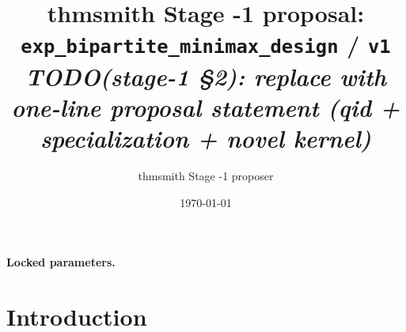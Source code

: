 \documentclass[11pt]{article}
\title{thmsmith Stage -1 proposal: \texttt{exp\_bipartite\_minimax\_design} / \texttt{v1}%
  \\ \large\textit{TODO(stage-1 \S2): replace with one-line proposal statement (qid + specialization + novel kernel)}}
\author{thmsmith Stage -1 proposer}
\date{\today}
\theoremstyle{definition}
\theoremstyle{plain}
\theoremstyle{remark}
\begin{document}
\maketitle


\paragraph{Locked parameters.}

\begin{abstract}
\end{abstract}

\section{Introduction}
%
%
%
%
\end{document}
